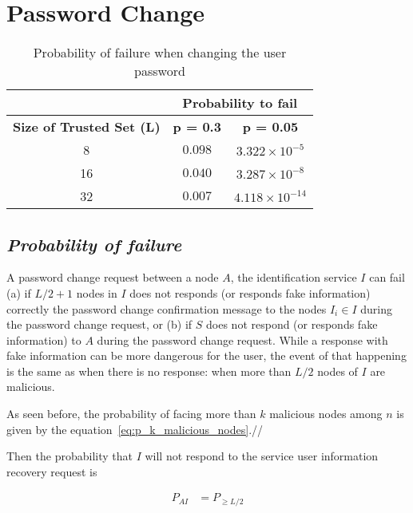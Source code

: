 \section{Password Change}
  \label{sec:eval_password_change}
  \begin{table}
    \centering
    \footnotesize
    \begin{tabular}{|c|c|c|}
      \cline{2-3}
      \multicolumn{1}{c|}{}&  \multicolumn{2}{c|}{\textbf{Probability to fail}} \\ \cline{2-3}
      \hline
      \textbf{Size of Trusted Set (L)} & \textbf{p = 0.3} & \textbf{p = 0.05} \\
      \hline \hline
      8 &  $0.098$ & $3.322 \times 10^{-5}$ \\
      \hline
      16 & $0.040$ & $3.287 \times 10^{-8}$  \\
      \hline
      32 & $0.007$ & $4.118 \times 10^{-14}$  \\
      \hline
    \end{tabular}
    \caption{Probability of failure when changing the user password}
    \label{tab:p_password_change}
  \end{table}
  
  \subsection{\textit{Probability of failure}}
    A password change request between a node $A$, the identification service
$I$ can fail (a) if $L/2 + 1$ nodes in $I$ does not responds (or responds fake
information) correctly the password change confirmation message to the nodes 
$I_i \in I$ during the password change request, or (b) if $S$ does not respond (or responds fake information) to $A$
during the password change request. While a response with fake information can be more dangerous for the
user, the event of that happening is the same as when there is no response:
when more than $L/2$ nodes of $I$ are malicious.

    As seen before, the probability of facing more than $k$ malicious nodes among
$n$ is given by the equation~\ref{eq:p_k_malicious_nodes}.//

    Then the probability that $I$ will not respond to the service user
information recovery request is

    \begin{align}
      P_{AI} &= P_{\ge L/2} \\
    \end{align}


